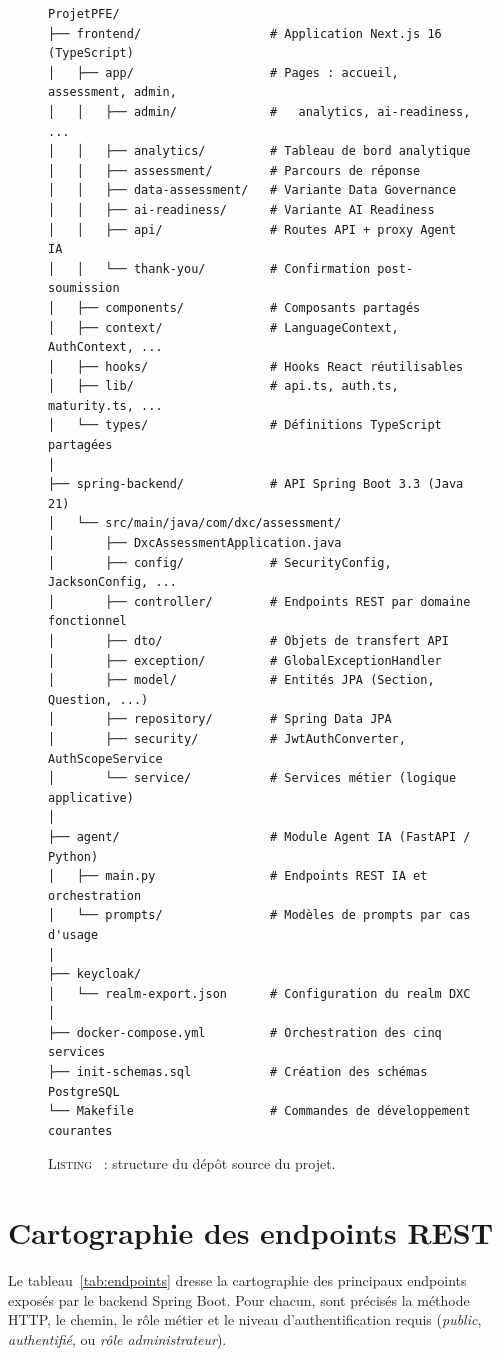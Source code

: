 \documentclass[12pt,a4paper]{report}
\begin{document}
\begin{figure}[H]
\centering
\begin{minipage}{0.92\textwidth}
\begin{verbatim}
ProjetPFE/
├── frontend/                  # Application Next.js 16 (TypeScript)
│   ├── app/                   # Pages : accueil, assessment, admin,
│   │   ├── admin/             #   analytics, ai-readiness, ...
│   │   ├── analytics/         # Tableau de bord analytique
│   │   ├── assessment/        # Parcours de réponse
│   │   ├── data-assessment/   # Variante Data Governance
│   │   ├── ai-readiness/      # Variante AI Readiness
│   │   ├── api/               # Routes API + proxy Agent IA
│   │   └── thank-you/         # Confirmation post-soumission
│   ├── components/            # Composants partagés
│   ├── context/               # LanguageContext, AuthContext, ...
│   ├── hooks/                 # Hooks React réutilisables
│   ├── lib/                   # api.ts, auth.ts, maturity.ts, ...
│   └── types/                 # Définitions TypeScript partagées
│
├── spring-backend/            # API Spring Boot 3.3 (Java 21)
│   └── src/main/java/com/dxc/assessment/
│       ├── DxcAssessmentApplication.java
│       ├── config/            # SecurityConfig, JacksonConfig, ...
│       ├── controller/        # Endpoints REST par domaine fonctionnel
│       ├── dto/               # Objets de transfert API
│       ├── exception/         # GlobalExceptionHandler
│       ├── model/             # Entités JPA (Section, Question, ...)
│       ├── repository/        # Spring Data JPA
│       ├── security/          # JwtAuthConverter, AuthScopeService
│       └── service/           # Services métier (logique applicative)
│
├── agent/                     # Module Agent IA (FastAPI / Python)
│   ├── main.py                # Endpoints REST IA et orchestration
│   └── prompts/               # Modèles de prompts par cas d'usage
│
├── keycloak/
│   └── realm-export.json      # Configuration du realm DXC
│
├── docker-compose.yml         # Orchestration des cinq services
├── init-schemas.sql           # Création des schémas PostgreSQL
└── Makefile                   # Commandes de développement courantes
\end{verbatim}
\end{minipage}
\label{lst:structure}
\caption*{\textsc{Listing \thefigure}~: structure du dépôt source du projet.}
\end{figure}

\section{Cartographie des endpoints REST}
Le tableau~\ref{tab:endpoints} dresse la cartographie des principaux endpoints exposés par le backend Spring Boot. Pour chacun, sont précisés la méthode HTTP, le chemin, le rôle métier et le niveau d'authentification requis (\textit{public}, \textit{authentifié}, ou \textit{rôle administrateur}).
\end{document}
